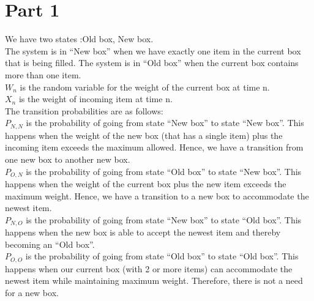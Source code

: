 \documentclass[10pt,a4paper]{article}
\begin{document}
\section{Part 1}
We have two states :{Old box, New box}. \\
The system is in ``New box'' when we have exactly one item in the current box that is being filled. The system is in ``Old box'' when the current box contains more than one item.\\
$ W_n $ is the random variable for the weight of the current box at time n.\\
$ X_n $ is the weight of incoming item at time n.\\

The transition probabilities are as follows:\\
$ P_{N,N} $ is the probability of going from state ``New box'' to state ``New box''. This happens when the weight of the new box (that has a single item) plus the incoming item exceeds the maximum allowed. Hence, we have a transition from one new box to another new box.\\
$ P_{O,N} $ is the probability of going from state ``Old box'' to state ``New box''. This happens when the weight of the current box plus the new item exceeds the maximum weight. Hence, we have a transition to a new box to accommodate the newest item.\\
$ P_{N,O} $ is the probability of going from state ``New box'' to state ``Old box''. This happens when the new box is able to accept the newest item and thereby becoming an ``Old box''.\\
$ P_{O,O} $ is the probability of going from state ``Old box'' to state ``Old box''. This happens when our current box (with 2 or more items) can accommodate the newest item while maintaining maximum weight. Therefore, there is not a need for a new box. \\
\end{document}
